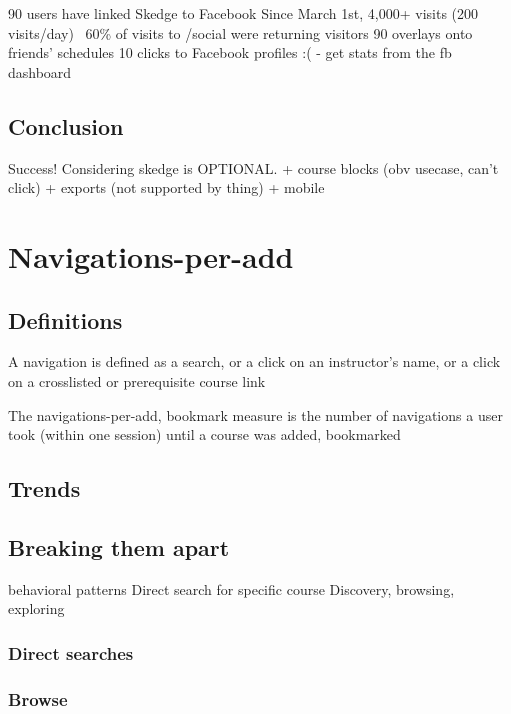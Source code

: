 90 users have linked Skedge to Facebook
Since March 1st,
4,000+ visits (200 visits/day)
~60\% of visits to /social were returning visitors
90 overlays onto friends’ schedules
10 clicks to Facebook profiles :(
- get stats from the fb dashboard

\subsection{Conclusion}

Success! Considering skedge is OPTIONAL.
+ course blocks (obv usecase, can't click)
+ exports (not supported by thing)
+ mobile

\section{Navigations-per-add}

\subsection{Definitions}

A navigation is defined as
a search, or
a click on an instructor’s name, or
a click on a crosslisted or prerequisite course link

The navigations-per-{add, bookmark} measure is
the number of navigations a user took (within one session) until a course was {added, bookmarked}

\subsection{Trends}


\subsection{Breaking them apart}

  behavioral patterns
  Direct search for specific course
  Discovery, browsing, exploring

  \subsubsection{Direct searches}

  \subsubsection{Browse}


